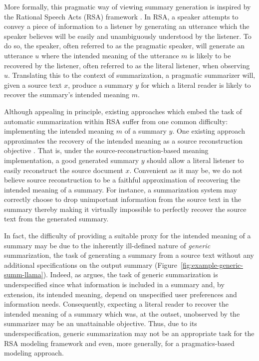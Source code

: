 \documentclass[11pt]{article}
\begin{document}
More formally, this pragmatic way of viewing summary generation is inspired by the Rational Speech Acts (RSA) framework \citep{degen_rational_2023}. In RSA, a speaker attempts to convey a piece of information to a listener by generating an utterance which the speaker believes will be easily and unambiguously understood by the listener. To do so, the speaker, often referred to as the pragmatic speaker, will generate an utterance $u$ where the intended meaning of the utterance $m$ is likely to be recovered by the listener, often referred to as the literal listener, when observing $u$. Translating this to the context of summarization, a pragmatic summarizer will, given a source text $x$, produce a summary $y$ for which a literal reader is likely to recover the summary's intended meaning $m$.

Although appealing in principle, existing approaches which embed the task of automatic summarization within RSA suffer from one common difficulty: implementing the intended meaning $m$ of a summary $y$. One existing approach approximates the recovery of the intended meaning as a source reconstruction objective \citep{shen-etal-2019-pragmatically}. That is, under the source-reconstruction-based meaning implementation, a good generated summary $y$ should allow a literal listener to easily reconstruct the source document $x$. Convenient as it may be, we do not believe source reconstruction to be a faithful approximation of recovering the intended meaning of a summary. For instance, a summarization system may correctly choose to drop unimportant information from the source text in the summary thereby making it virtually impossible to perfectly recover the source text from the generated summary.

In fact, the difficulty of providing a suitable proxy for the intended meaning of a summary may be due to the inherently ill-defined nature of \emph{generic} summarization, the task of generating a summary from a source text without any additional specifications on the output summary (Figure~\ref{fig:example-generic-summ-llama}). Indeed, as \citet{kryscinski2019neural} argues, the task of generic summarization is underspecified since what information is included in a summary and, by extension, its intended meaning, depend on unspecified user preferences and information needs. Consequently, expecting a literal reader to recover the intended meaning of a summary which was, at the outset, unobserved by the summarizer may be an unattainable objective. Thus, due to its underspecification, generic summarization may not be an appropriate task for the RSA modeling framework and even, more generally, for a pragmatics-based modeling approach.
\end{document}

